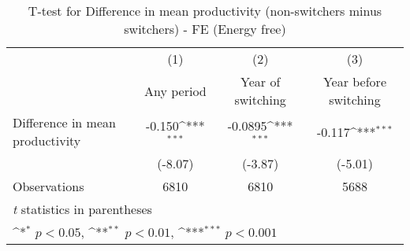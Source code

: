 \begin{table}[htbp]\centering
\def\sym#1{\ifmmode^{#1}\else\(^{#1}\)\fi}
\caption{T-test for Difference in mean productivity (non-switchers minus switchers) - FE (Energy free)}
\begin{tabular}{l*{3}{c}}
\hline\hline
                    &\multicolumn{1}{c}{(1)}&\multicolumn{1}{c}{(2)}&\multicolumn{1}{c}{(3)}\\
                    &\multicolumn{1}{c}{Any period}&\multicolumn{1}{c}{Year of switching}&\multicolumn{1}{c}{Year before switching}\\
\hline
Difference in mean productivity&      -0.150\sym{***}&     -0.0895\sym{***}&      -0.117\sym{***}\\
                    &     (-8.07)         &     (-3.87)         &     (-5.01)         \\
\hline
Observations        &        6810         &        6810         &        5688         \\
\hline\hline
\multicolumn{4}{l}{\footnotesize \textit{t} statistics in parentheses}\\
\multicolumn{4}{l}{\footnotesize \sym{*} \(p<0.05\), \sym{**} \(p<0.01\), \sym{***} \(p<0.001\)}\\
\end{tabular}
\end{table}
